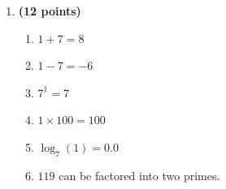 \documentclass[12pt]{amsart}
\begin{document}
\begin{enumerate}
\vfill 
\def \a{7}\def \atwoone{2}\def \atwotwo{-2}\def \atwothree{1}\def \btwothree{7}\def \sumtwothree{8}\def \diftwothree{-6}\def \bigtwothree{100}\def \powtwothree{7}\def \logtwothree{0.0}\def \factortwothree{119}\def \atwofour{1.91}\def \btwofour{1.653}\def \tooshorttwofour{10.1}\def \moneytwofour{10.10}\def \longertwofour{10.10000}\def \atwofive{0.12}\def \btwofive{0.12346}\def \athreeone{5}\def \bthreeone{7}\def \setthreetwo{[3, 7, 7]}\def \athreetwo{3}\def \bthreetwo{7}\def \cthreetwo{7}\def \controlthreethree{-8}\def \athreethree{2}\def \topthreethree{1}\def \athreefour{4}\def \bthreefour{3}\def \listthreefour{[1, 2, 3, 5]}\def \afourone{8}\def \bfourone{4}\def \fracfourone{2}\def \rootfourtwo{20}\def \simplifiedfourtwo{2 \sqrt{5}}\def \sqrtlistfourtwo{[2, 5]}\def \outfourtwo{2}\def \infourtwo{5}\def \wowfourtwo{1}\def \afourthree{5}\def \nicethreefour{3x^{2}-x^{}+5}\def \nastythreefour{xyz^{3}+5}\def \cfourthree{-4}\def \dfourthree{-9}\def \infourthree{-4x^{}}\def \outfourthree{-9y^{}}\def \afourfour{1410571}\def \nicefourfour{1,410,571}\def \goodfourfour{1,000,000.12345}\def \badfourfour{1,000,000.1}
\item {\bf (12 points)} 
 \begin{enumerate}
\item $\atwothree + \btwothree = \sumtwothree$
\item $\atwothree - \btwothree = \diftwothree$
\item $\btwothree^{\atwothree} = \powtwothree$
\item $\atwothree \times 100 = \bigtwothree$
\item $\log_{\btwothree}(\atwothree) = \logtwothree$
\item $\factortwothree$ can be factored into two primes.
\end{enumerate} 
\vfill 
\def \a{7}\def \atwoone{3}\def \atwotwo{5}\def \atwothree{2}\def \btwothree{9}\def \sumtwothree{11}\def \diftwothree{-7}\def \bigtwothree{200}\def \powtwothree{81}\def \logtwothree{0.3154648767857287}\def \factortwothree{26}\def \atwofour{1.5}\def \btwofour{1.796}\def \tooshorttwofour{10.1}\def \moneytwofour{10.10}\def \longertwofour{10.10000}\def \atwofive{0.12}\def \btwofive{0.12346}\def \athreeone{6}\def \bthreeone{4}\def \setthreetwo{[2, 5, 6]}\def \athreetwo{2}\def \bthreetwo{5}\def \cthreetwo{6}\def \controlthreethree{8}\def \athreethree{4}\def \topthreethree{1}\def \athreefour{5}\def \bthreefour{4}\def \listthreefour{[1, 2, 3, 4]}\def \afourone{4}\def \bfourone{4}\def \fracfourone{1}\def \rootfourtwo{8}\def \simplifiedfourtwo{2 \sqrt{2}}\def \sqrtlistfourtwo{[2, 2]}\def \outfourtwo{2}\def \infourtwo{2}\def \wowfourtwo{1}\def \afourthree{0}\def \nicethreefour{3x^{2}-x^{}}\def \nastythreefour{xyz^{3}}\def \cfourthree{-4}\def \dfourthree{9}\def \infourthree{-4x^{}}\def \outfourthree{+9y^{}}\def \afourfour{1584379}\def \nicefourfour{1,584,379}\def \goodfourfour{1,000,000.12345}\def \badfourfour{1,000,000.1}

\end{enumerate}
\end{document}
